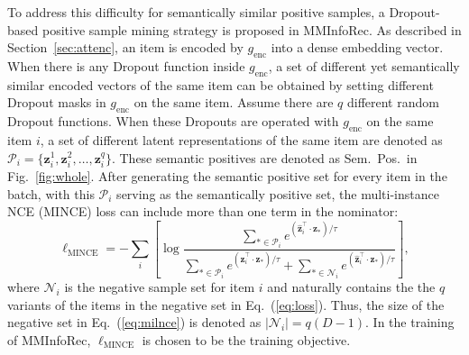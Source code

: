 \documentclass[conference]{IEEEtran}
\begin{document}
To address this difficulty for semantically similar positive samples, a Dropout-based positive sample mining strategy is proposed in MMInfoRec. As described in Section~\ref{sec:attenc}, an item is encoded by $g_\text{enc}$ into a dense embedding vector. When there is any Dropout function inside $g_\text{enc}$, a set of different yet semantically similar encoded vectors of the same item can be obtained by setting different Dropout masks in $g_\text{enc}$ on the same item. Assume there are $q$ different random Dropout functions. When these Dropouts are operated with $g_\text{enc}$ on the same item $i$, a set of different latent representations of the same item are denoted as $\mathcal{P}_i=\{\mathbf{z}^1_i,\mathbf{z}^2_i,\ldots,\mathbf{z}^q_i\}$. These semantic positives are denoted as Sem.\ Pos.\ in Fig.~\ref{fig:whole}. After generating the semantic positive set for every item in the batch, with this $\mathcal{P}_i$ serving as the semantically positive set, the multi-instance NCE (MINCE) loss can include more than one term in the nominator:
\begin{equation}
\label{eq:milnce}
    \ell_\text{MINCE}=-\sum_{i}\left[\log \frac{\sum\limits_{* \in \mathcal{P}_i}e^{\left(\hat{\mathbf{z}}_{i}^{\top} \cdot \mathbf{z}_{*}\right)/\tau}}{\sum\limits_{* \in \mathcal{P}_i}e^{\left(\hat{\mathbf{z}}_{i}^{\top} \cdot \mathbf{z}_{*}\right)/\tau}+\sum\limits_{* \in \mathcal{N}_i}e^{\left(\hat{\mathbf{z}}_{i}^{\top} \cdot \mathbf{z}_{*}\right)/\tau}}\right],
\end{equation}
where $\mathcal{N}_i$ is the negative sample set for item $i$ and naturally contains the the $q$ variants of the items in the negative set in Eq.~(\ref{eq:loss}). Thus, the size of the negative set in Eq.~(\ref{eq:milnce}) is denoted as $|\mathcal{N}_i|=q(D-1)$. In the training of MMInfoRec, $\ell_\text{MINCE}$ is chosen to be the training objective.
\end{document}
